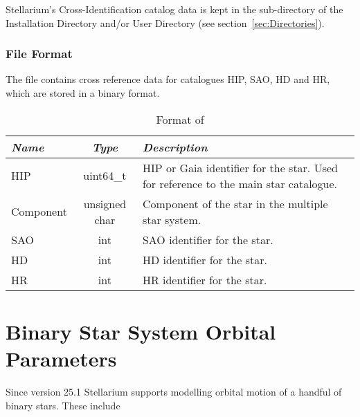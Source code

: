 
Stellarium's Cross-Identification catalog data is kept
in the  sub-directory of the Installation Directory and/or User Directory (see section~\ref{sec:Directories}).

\subsubsection{File Format}
\label{sec:StarCatalogues:CrossIdentificationData:file}

The file  contains cross reference data for catalogues HIP, SAO, HD and HR, which are stored in a binary format.

\begin{table}[htb]
\begin{tabularx}{\textwidth}{l|c|X}\toprule
\emph{Name} & \emph{Type}   & \emph{Description}\\\midrule
HIP         & uint64\_t     & HIP or Gaia identifier for the star. Used for reference to the main star catalogue.\\
Component   & unsigned char & Component of the star in the multiple star system.\\
SAO    	    & int           & SAO identifier for the star.\\
HD          & int           & HD identifier for the star.\\
HR          & int           & HR identifier for the star.\\\bottomrule
\end{tabularx}
\caption{Format of }
\label{tab:StarCatalogues:CrossIdentificationData:file}
\end{table}


\section{Binary Star System Orbital Parameters}
\label{sec:StarCatalogues:BinaryOrbitalParameters}

Since version 25.1 Stellarium supports modelling orbital motion of a handful of binary stars. These include

